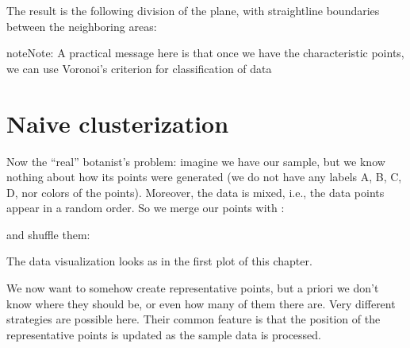 \documentclass[letterpaper,10pt,english]{jupyterBook}
\begin{document}
\sphinxAtStartPar
The result is the following division of the plane, with straight\sphinxhyphen{}line boundaries between the neighboring areas:

\noindent{}

\begin{sphinxadmonition}{note}{Note:}
\sphinxAtStartPar
A practical message here is that once we have the characteristic points, we can use Voronoi’s criterion for classification of data
\end{sphinxadmonition}


\section{Naive clusterization}
\label{\detokenize{docs/unsupervised:naive-clusterization}}
\sphinxAtStartPar
Now the “real” botanist’s problem:  imagine we have our sample, but we know nothing about how its points were generated (we do not have any labels A, B, C, D, nor colors of the points). Moreover, the data is mixed, i.e., the data points appear in a random order. So we merge our points with :

\begin{sphinxVerbatim}[commandchars=\\\{\}]
   
\end{sphinxVerbatim}

\sphinxAtStartPar
and shuffle them:

\begin{sphinxVerbatim}[commandchars=\\\{\}]
\end{sphinxVerbatim}

\sphinxAtStartPar
The data visualization looks as in the first plot of this chapter.

\sphinxAtStartPar
We now want to somehow create representative points, but a priori we don’t know where they should be, or even how many of them there are. Very different strategies are possible here. Their common feature is that the position of the representative points is updated as the sample data is processed.
\end{document}
